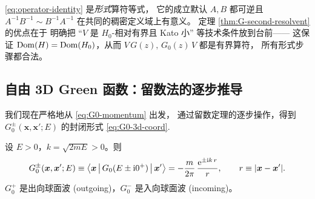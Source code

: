 \begin{remark}
\eqref{eq:operator-identity} 是\emph{形式}算符等式，
它的成立默认 $A,B$ 都可逆且 $A^{-1}B^{-1}\sim B^{-1}A^{-1}$ 在共同的稠密定义域上有意义。
定理 \ref{thm:G-second-resolvent} 的优点在于
明确把 ``$V$ 是 $H_0$-相对有界且 Kato 小'' 等技术条件放到台前——
这保证 $\operatorname{Dom}(H)=\operatorname{Dom}(H_0)$，从而 $V\,G(z),\,G_0(z)\,V$ 都是有界算符，
所有形式步骤都合法。
\end{remark}

\subsection{自由 3D Green 函数：留数法的逐步推导}

我们现在严格地从 \eqref{eq:G0-momentum} 出发，
通过留数定理的逐步操作，得到
$G_0^\pm(\bm x,\bm x';E)$ 的封闭形式 \eqref{eq:G0-3d-coord}.

\begin{theorem}[3D 自由 Green 函数]\label{thm:G-free-3d}
设 $E>0$，$k=\sqrt{2mE}>0$。则
\begin{equation}\label{eq:G-free-3d-thm}
  G_0^\pm(\bm x,\bm x';E)
   \equiv \left\langle \bm x \,\middle|\, G_0(E\pm\mathrm{i} 0^+) \,\middle|\, \bm x' \right\rangle
   = -\frac{m}{2\pi}\,
      \frac{\mathrm{e}^{\pm\mathrm{i} k\,r}}{r},\qquad
   r\equiv|\bm x-\bm x'|.
\end{equation}
$G_0^+$ 是出向球面波 (outgoing)，$G_0^-$ 是入向球面波 (incoming)。
\end{theorem}

